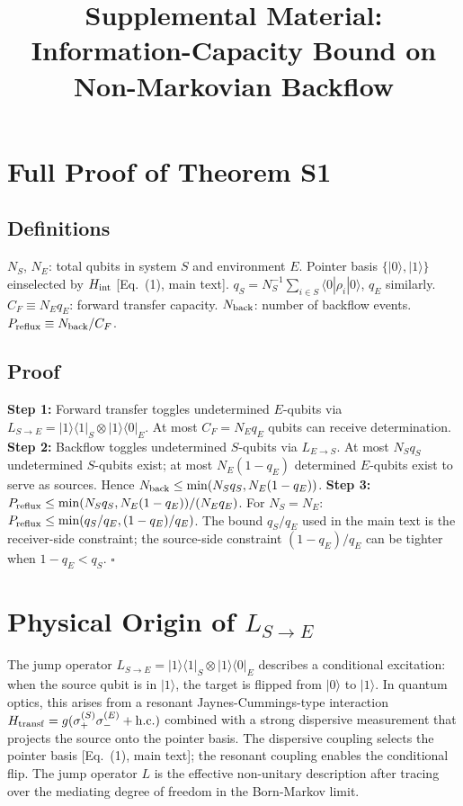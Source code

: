 \documentclass[aps,prl,onecolumn]{revtex4-2}
\begin{document}
\title{Supplemental Material: Information-Capacity Bound on Non-Markovian Backflow}

\maketitle

\section{Full Proof of Theorem S1}

\subsection{Definitions}

$N_S$, $N_E$: total qubits in system $S$ and environment $E$. Pointer basis $\{|0\rangle,|1\rangle\}$ einselected by $H_{\rm int}$ [Eq.~(1), main text]. $q_S = N_S^{-1}\sum_{i\in S}\langle 0|\rho_i|0\rangle$, $q_E$ similarly. $C_F \equiv N_E q_E$: forward transfer capacity. $N_{\rm back}$: number of backflow events. $P_{\rm reflux} \equiv N_{\rm back}/C_F$.

\subsection{Proof}

\textbf{Step 1:} Forward transfer toggles undetermined $E$-qubits via $L_{S\to E}=|1\rangle\langle 1|_S\otimes|1\rangle\langle 0|_E$. At most $C_F = N_E q_E$ qubits can receive determination. \textbf{Step 2:} Backflow toggles undetermined $S$-qubits via $L_{E\to S}$. At most $N_S q_S$ undetermined $S$-qubits exist; at most $N_E(1-q_E)$ determined $E$-qubits exist to serve as sources. Hence $N_{\rm back} \leq \min(N_S q_S, N_E(1-q_E))$. \textbf{Step 3:} $P_{\rm reflux} \leq \min(N_S q_S, N_E(1-q_E))/(N_E q_E)$. For $N_S=N_E$: $P_{\rm reflux} \leq \min(q_S/q_E, (1-q_E)/q_E)$. The bound $q_S/q_E$ used in the main text is the receiver-side constraint; the source-side constraint $(1-q_E)/q_E$ can be tighter when $1-q_E < q_S$. $\square$

\section{Physical Origin of $L_{S\to E}$}

The jump operator $L_{S\to E}=|1\rangle\langle 1|_S\otimes|1\rangle\langle 0|_E$ describes a conditional excitation: when the source qubit is in $|1\rangle$, the target is flipped from $|0\rangle$ to $|1\rangle$. In quantum optics, this arises from a resonant Jaynes-Cummings-type interaction $H_{\rm transf} = g(\sigma_+^{(S)}\sigma_-^{(E)} + {\rm h.c.})$ combined with a strong dispersive measurement that projects the source onto the pointer basis. The dispersive coupling selects the pointer basis [Eq.~(1), main text]; the resonant coupling enables the conditional flip. The jump operator $L$ is the effective non-unitary description after tracing over the mediating degree of freedom in the Born-Markov limit.
\end{document}
